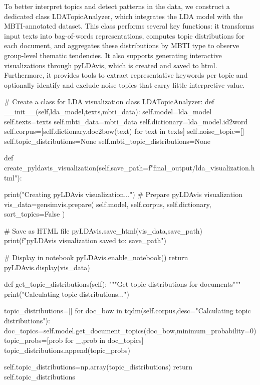 \documentclass[12pt]{article}
\begin{document}
	To better interpret topics and detect patterns in the data, we construct a dedicated class LDATopicAnalyzer, which integrates the LDA model with the MBTI-annotated dataset. This class performs several key functions: it transforms input texts into bag-of-words representations, computes topic distributions for each document, and aggregates these distributions by MBTI type to observe group-level thematic tendencies. It also supports generating interactive visualizations through pyLDAvis, which is created and saved to html. Furthermore, it provides tools to extract representative keywords per topic and optionally identify and exclude noise topics that carry little interpretive value. 
	\begin{python}
# Create a class for LDA visualization
class LDATopicAnalyzer:
    def __init__(self,lda_model,texts,mbti_data):
        self.model=lda_model
        self.texts=texts
        self.mbti_data=mbti_data
        self.dictionary=lda_model.id2word
        self.corpus=[self.dictionary.doc2bow(text) for text in texts]
        self.noise_topic=[]
        self.topic_distributions=None
        self.mbti_topic_distributions=None
        
    def create_pyldavis_visualization(self,save_path=f"final_output/lda_visualization.html"):
        
        print("Creating pyLDAvis visualization...")
        # Prepare pyLDAvis visualization
        vis_data=gensimvis.prepare(
            self.model,
            self.corpus,
            self.dictionary,
            sort_topics=False
        )
        
        # Save as HTML file
        pyLDAvis.save_html(vis_data,save_path)
        print(f"pyLDAvis visualization saved to: {save_path}")
        
        # Display in notebook
        pyLDAvis.enable_notebook()
        return pyLDAvis.display(vis_data)
    
    def get_topic_distributions(self):
        """Get topic distributions for documents"""
        print("Calculating topic distributions...")
        
        topic_distributions=[]
        for doc_bow in tqdm(self.corpus,desc="Calculating topic distributions"):
            doc_topics=self.model.get_document_topics(doc_bow,minimum_probability=0)
            topic_probs=[prob for _,prob in doc_topics]
            topic_distributions.append(topic_probs)
        
        self.topic_distributions=np.array(topic_distributions)
        return self.topic_distributions
    

\end{python}
\end{document}
